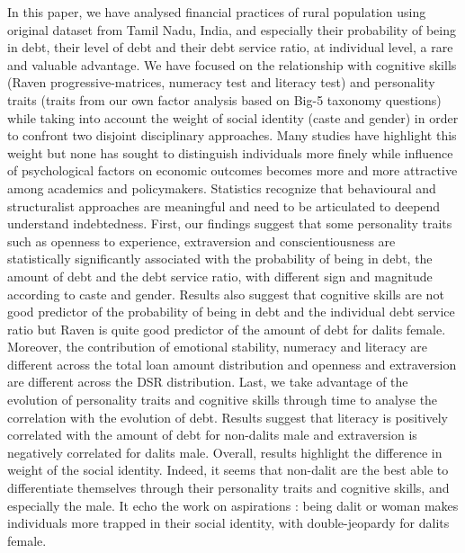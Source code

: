 \documentclass[a4paper, 11pt, onecolumn]{article}
\begin{document}
In this paper, we have analysed financial practices of rural population using original dataset from Tamil Nadu, India, and especially their probability of being in debt, their level of debt and their debt service ratio, at individual level, a rare and valuable advantage.
We have focused on the relationship with cognitive skills (Raven progressive-matrices, numeracy test and literacy test) and personality traits (traits from our own factor analysis based on Big-5 taxonomy questions) while taking into account the weight of social identity (caste and gender) in order to confront two disjoint disciplinary approaches.
Many studies have highlight this weight but none has sought to distinguish individuals more finely while influence of psychological factors on economic outcomes becomes more and more attractive among academics and policymakers.
Statistics recognize that behavioural and structuralist approaches are meaningful and need to be articulated to deepend understand indebtedness.
First, our findings suggest that some personality traits such as openness to experience, extraversion and conscientiousness are statistically significantly associated with the probability of being in debt, the amount of debt and the debt service ratio, with different sign and magnitude according to caste and gender. 
Results also suggest that cognitive skills are not good predictor of the probability of being in debt and the individual debt service ratio but Raven is quite good predictor of the amount of debt for dalits female.
Moreover, the contribution of emotional stability, numeracy and literacy are different across the total loan amount distribution and openness and extraversion are different across the DSR distribution.
Last, we take advantage of the evolution of personality traits and cognitive skills through time to analyse the correlation with the evolution of debt.
Results suggest that literacy is positively correlated with the amount of debt for non-dalits male and extraversion is negatively correlated for dalits male.
Overall, results highlight the difference in weight of the social identity.
Indeed, it seems that non-dalit are the best able to differentiate themselves through their personality traits and cognitive skills, and especially the male.
It echo the work on aspirations \citep{Mukherjee2017, Sarkar2020}: being dalit or woman makes individuals more trapped in their social identity, with double-jeopardy for dalits female.
\end{document}

